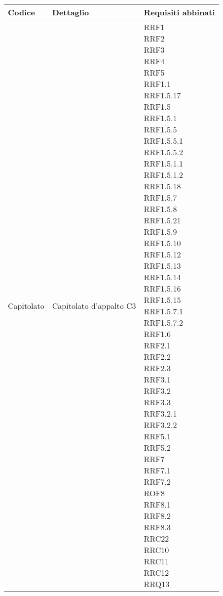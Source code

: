 
				\begin{longtabu} spread 1cm [c]{|X[l]|X[l]|X[l]|}
					\hline
					\rowfont{\bf \centering}
					Codice &
					Dettaglio &
					Requisiti abbinati \\
					\hline
					\endhead
					
					Capitolato & Capitolato d'appalto C3 & \parbox[t]{4cm}{ RRF1 \\ RRF2 \\ RRF3 \\ RRF4 \\ RRF5 \\ RRF1.1 \\ RRF1.5.17 \\ RRF1.5 \\ RRF1.5.1 \\ RRF1.5.5 \\ RRF1.5.5.1 \\ RRF1.5.5.2 \\ RRF1.5.1.1 \\ RRF1.5.1.2 \\ RRF1.5.18 \\ RRF1.5.7 \\ RRF1.5.8 \\ RRF1.5.21 \\ RRF1.5.9 \\ RRF1.5.10 \\ RRF1.5.12 \\ RRF1.5.13 \\ RRF1.5.14 \\ RRF1.5.16 \\ RRF1.5.15 \\ RRF1.5.7.1 \\ RRF1.5.7.2 \\ RRF1.6 \\ RRF2.1 \\ RRF2.2 \\ RRF2.3 \\ RRF3.1 \\ RRF3.2 \\ RRF3.3 \\ RRF3.2.1 \\ RRF3.2.2 \\ RRF5.1 \\ RRF5.2 \\ RRF7 \\ RRF7.1 \\ RRF7.2 \\ ROF8 \\ RRF8.1 \\ RRF8.2 \\ RRF8.3 \\ RRC22 \\ RRC10 \\ RRC11 \\ RRC12 \\ RRQ13 } \\ \hline

\end{longtabu}
